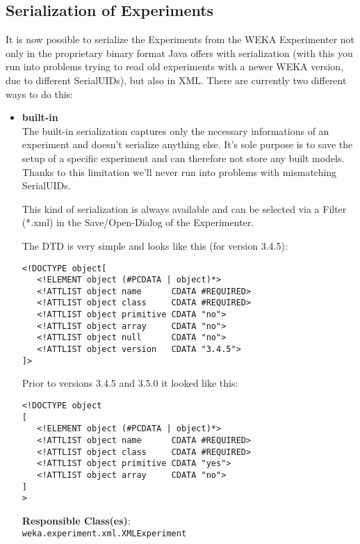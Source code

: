 \subsection{Serialization of Experiments}
It is now possible to serialize the Experiments from the WEKA
Experimenter not only in the proprietary binary format Java offers
with serialization (with this you run into problems trying to read old
experiments with a newer WEKA version, due to different SerialUIDs),
but also in XML. There are currently two different ways to do this:

\begin{itemize}
\item \textbf{built-in}\\
The built-in serialization captures only the necessary informations of
an experiment and doesn't serialize anything else. It's sole purpose
is to save the setup of a specific experiment and can therefore not
store any built models. Thanks to this limitation we'll never run into
problems with mismatching SerialUIDs.

This kind of serialization is always available and can be selected via
a Filter (*.xml) in the Save/Open-Dialog of the Experimenter.

The DTD is very simple and looks like this (for version 3.4.5): 

\begin{verbatim}
<!DOCTYPE object[
   <!ELEMENT object (#PCDATA | object)*>
   <!ATTLIST object name      CDATA #REQUIRED>
   <!ATTLIST object class     CDATA #REQUIRED>
   <!ATTLIST object primitive CDATA "no">
   <!ATTLIST object array     CDATA "no">   
   <!ATTLIST object null      CDATA "no">   
   <!ATTLIST object version   CDATA "3.4.5">
]>
\end{verbatim}

\noindent Prior to versions 3.4.5 and 3.5.0 it looked like this: 

\begin{verbatim}
<!DOCTYPE object
[
   <!ELEMENT object (#PCDATA | object)*>
   <!ATTLIST object name      CDATA #REQUIRED>
   <!ATTLIST object class     CDATA #REQUIRED>
   <!ATTLIST object primitive CDATA "yes">
   <!ATTLIST object array     CDATA "no">
]
>
\end{verbatim}

\noindent \textbf{Responsible Class(es)}:\\

\verb=weka.experiment.xml.XMLExperiment=\\


\end{itemize}

